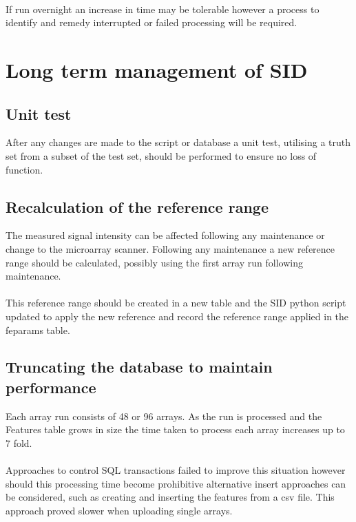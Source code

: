 \paragraph*{}
If run overnight an increase in time may be tolerable however a process to identify and remedy interrupted or failed processing will be required. 

\section{Long term management of SID}
\subsection{Unit test}
After any changes are made to the script or database a unit test, utilising a truth set from a subset of the test set, should be performed to ensure no loss of function.

\subsection{Recalculation of the reference range}
The measured signal intensity can be affected following any maintenance or change to the microarray scanner. Following any maintenance a new reference range should be calculated, possibly using the first array run following maintenance. 
\paragraph*{}
This reference range should be created in a new table and the SID python script updated to apply the new reference and record the reference range applied in the feparams table.

\subsection{Truncating the database to maintain performance}
Each array run consists of 48 or 96 arrays. As the run is processed and the Features table grows in size the time taken to process each array increases up to 7 fold.
\paragraph*{}
Approaches to control SQL transactions failed to improve this situation however should this processing time become prohibitive alternative insert approaches can be considered, such as creating and inserting the features from a \ac{csv} file. This approach proved slower when uploading single arrays.
